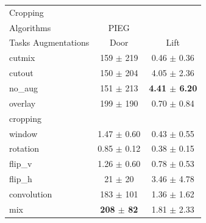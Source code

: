 \begin{tabular}{lcc}
Cropping & & \\
Algorithms & PIEG & \\
Tasks Augmentations & Door & Lift \\
cutmix          & 159 $\pm$ 219 & 0.46 $\pm$ 0.36 \\
cutout          & 150 $\pm$ 204 & 4.05 $\pm$ 2.36 \\
no\_aug         & 151 $\pm$ 213 & \textbf{4.41 $\pm$ 6.20} \\
overlay         & 199 $\pm$ 190 & 0.70 $\pm$ 0.84 \\
cropping        &  &  \\
window          & 1.47 $\pm$ 0.60 & 0.43 $\pm$ 0.55 \\
rotation        & 0.85 $\pm$ 0.12 & 0.38 $\pm$ 0.15 \\
flip\_v         & 1.26 $\pm$ 0.60 & 0.78 $\pm$ 0.53 \\
flip\_h         & 21 $\pm$ 20 & 3.46 $\pm$ 4.78 \\
convolution     & 183 $\pm$ 101 & 1.36 $\pm$ 1.62 \\
mix             & \textbf{208 $\pm$ 82} & 1.81 $\pm$ 2.33 \\
\end{tabular}